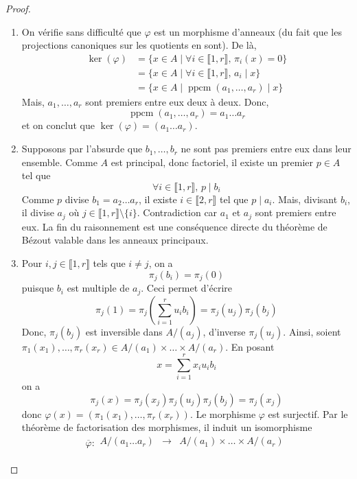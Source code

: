   \begin{proof}
    \begin{enumerate}[label={\bfseries(\roman*)}]
      \item On vérifie sans difficulté que $\varphi$ est un morphisme d'anneaux (du fait que les projections canoniques sur les quotients en sont). De là,
      \begin{align*}
        \ker(\varphi) &= \{ x \in A \mid \forall i \in \llbracket 1, r \rrbracket, \, \pi_i(x) = 0 \} \\
        &= \{ x \in A \mid \forall i \in \llbracket 1, r \rrbracket, \, a_i \mid x \} \\
        &= \{ x \in A \mid \operatorname{ppcm}(a_1, \dots, a_r) \mid x \}
      \end{align*}
      Mais, $a_1, \dots, a_r$ sont premiers entre eux deux à deux. Donc,
      \[ \operatorname{ppcm}(a_1, \dots, a_r) = a_1 \dots a_r \]
      et on conclut que $\ker(\varphi) = (a_1 \dots a_r)$.
      \item Supposons par l'absurde que $b_1, \dots, b_r$ ne sont pas premiers entre eux dans leur ensemble. Comme $A$ est principal, donc factoriel, il existe un premier $p \in A$ tel que
      \[ \forall i \in \llbracket 1, r \rrbracket, \, p \mid b_i \]
      Comme $p$ divise $b_1 = a_2 \dots a_r$, il existe $i \in \llbracket 2, r \rrbracket$ tel que $p \mid a_i$. Mais, divisant $b_i$, il divise $a_j$ où $j \in \llbracket 1, r \rrbracket \setminus \{ i \}$. Contradiction car $a_1$ et $a_j$ sont premiers entre eux. La fin du raisonnement est une conséquence directe du théorème de Bézout valable dans les anneaux principaux.
      \item Pour $i, j \in \llbracket 1, r \rrbracket$ tels que $i \neq j$, on a
      \[ \pi_j(b_i) = \pi_j(0) \]
      puisque $b_i$ est multiple de $a_j$. Ceci permet d'écrire
      \[ \pi_j(1) = \pi_j\left( \sum_{i=1}^{r} u_i b_i \right) = \pi_j(u_j) \pi_j(b_j) \]
      Donc, $\pi_j(b_j)$ est inversible dans $A/(a_j)$, d'inverse $\pi_j(u_j)$. Ainsi, soient $\pi_1(x_1), \dots, \pi_r(x_r) \in A/(a_1) \times \dots \times A/(a_r)$. En posant
      \[ x = \sum_{i=1}^r x_i u_i b_i \]
      on a
      \[ \pi_j(x) = \pi_j(x_j) \pi_j(u_j) \pi_j(b_j) = \pi_j(x_j) \]
      donc $\varphi(x) = (\pi_1(x_1), \dots, \pi_r(x_r))$. Le morphisme $\varphi$ est surjectif. Par le théorème de factorisation des morphismes, il induit un isomorphisme
      \[
        \overline{\varphi} :
        \begin{array}{ccc}
          A/(a_1 \dots a_r) &\rightarrow& A/(a_1) \times \dots \times A/(a_r) \\

\end{array}\]
\end{enumerate}
\end{proof}
